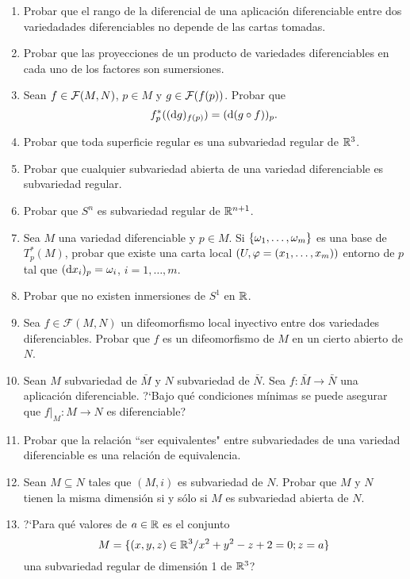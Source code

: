 \documentclass[cursovd_portada.tex]{subfiles}
\begin{document}
\begin{enumerate}
\item Probar que el rango de la diferencial de una aplicación diferenciable entre dos variedadades diferenciables
no depende de las cartas tomadas. \item Probar que las
proyecciones de un producto de variedades diferenciables en cada
uno de los factores son sumersiones. \item Sean
$f\in{\cal F}(M,N)$, $p\in M$ y $g\in{\cal F}(f(p))$. Probar que
$$f_p^*(({\rm d} g)_{f(p)})=({\rm d} (g\circ f))_p.$$ \item Probar que
toda superficie regular es una subvariedad regular de $\mathbb{R}^3$.
\item Probar que cualquier subvariedad abierta de una variedad
diferenciable es subvariedad regular. \item Probar que $S^n$ es
subvariedad regular de $\mathbb{R}^{n+1}$.
\item Sea $M$ una variedad diferenciable y $p\in M$. Si
$\{\omega_1,\dots ,\omega_m\}$ es una base de $T_p^*(M)$, probar que
existe una carta local $(U,\varphi=(x_1,\dots ,x_m))$ entorno de $p$
tal que $({\rm d} x_i)_p=\omega_i$, $i=1,\dots ,m$. \item Probar que
no existen inmersiones de $S^1$ en $\mathbb{R}$. \item Sea
$f\in\mathcal{F}(M,N)$ un difeomorfismo local inyectivo entre dos
variedades diferenciables. Probar que $f$ es un difeomorfismo de
$M$ en un cierto abierto de $N$. \item Sean $M$ subvariedad de
$\bar{M}$ y $N$ subvariedad de $\bar{N}$. Sea $f: \bar{M}
\longrightarrow \bar{N}$ una aplicación diferenciable. ?`Bajo
qué condiciones mínimas se puede asegurar que $f|_M:M
\longrightarrow N$ es diferenciable? \item Probar que la
relación ``ser equivalentes" entre subvariedades de una
variedad diferenciable es una relación de equivalencia.
\item Sean $M\subseteq N$ tales que $(M,i)$ es subvariedad de $N$. Probar que $M$ y $N$ tienen la misma dimensión si y sólo si $M$ es subvariedad abierta de $N$.
\item
?`Para qué valores de $a\in\mathbb{R}$ es el conjunto
$$M=\{(x,y,z)\in\mathbb{R}^3/x^2+y^2-z+2=0;z=a\}$$
una subvariedad regular de dimensión 1 de $\mathbb{R}^3$?
\end{enumerate}
\end{document}
